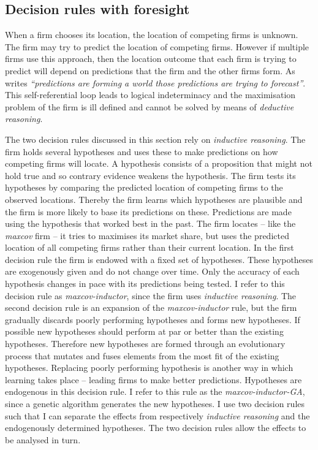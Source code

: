 \documentclass[preprint, 12pt]{elsarticle}
\begin{document}
\subsection{Decision rules with foresight}
\label{sec:foresight}

When a firm chooses its location, the location of competing firms is unknown. The firm may try to predict the location of competing firms. However if multiple firms use this approach, then the location outcome that each firm is trying to predict will depend on predictions that the firm and the other firms form. As \citet[p.~175]{Arthur_2014} writes \emph{``predictions are forming a world those predictions are trying to forecast''}. This self-referential loop leads to logical indeterminacy and the maximisation problem of the firm is ill defined and cannot be solved by means of \emph{deductive reasoning}.

The two decision rules discussed in this section rely on \emph{inductive reasoning}. The firm holds several hypotheses and uses these to make predictions on how competing firms will locate. A hypothesis consists of a proposition that might not hold true and so contrary evidence weakens the hypothesis. The firm tests its hypotheses by comparing the predicted location of competing firms to the observed locations. Thereby the firm learns which hypotheses are plausible and the firm is more likely to base its predictions on these. Predictions are made using the hypothesis that worked best in the past. The firm locates -- like the \emph{maxcov} firm -- it tries to maximises its market share, but uses the predicted location of all competing firms rather than their current location. In the first decision rule the firm is endowed with a fixed set of hypotheses. These hypotheses are exogenously given and do not change over time. Only the accuracy of each hypothesis changes in pace with its predictions being tested. I refer to this decision rule as \emph{maxcov-inductor}, since the firm uses \emph{inductive reasoning}. The second decision rule is an expansion of the \emph{maxcov-inductor} rule, but the firm gradually discards poorly performing hypotheses and forms new hypotheses. If possible new hypotheses should perform at par or better than the existing hypotheses. Therefore new hypotheses are formed through an evolutionary process that mutates and fuses elements from the most fit of the existing hypotheses. Replacing poorly performing hypothesis is another way in which learning takes place -- leading firms to make better predictions. Hypotheses are endogenous in this decision rule. I refer to this rule as the \emph{maxcov-inductor-GA}, since a genetic algorithm generates the new hypotheses. I use two decision rules such that I can separate the effects from respectively \emph{inductive reasoning} and the endogenously determined hypotheses. The two decision rules allow the effects to be analysed in turn.
\end{document}
